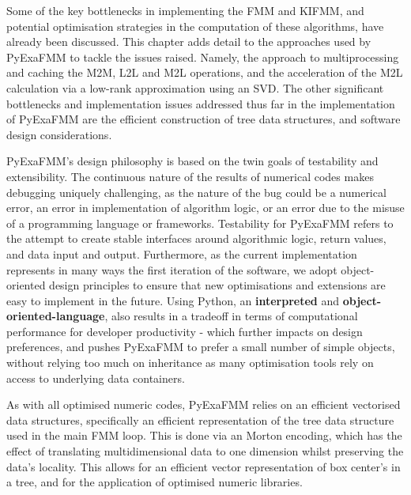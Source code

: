 Some of the key bottlenecks in implementing the \gls{FMM} and \gls{KIFMM}, and potential
optimisation strategies in the computation of these algorithms, have already been
discussed. This chapter adds detail to the approaches used by \gls{PyExaFMM} to tackle
the issues raised. Namely, the approach to multiprocessing and caching the \gls{M2M},
\gls{L2L} and \gls{M2L} operations, and the acceleration of the \gls{M2L} calculation
via a low-rank approximation using an \gls{SVD}. The other significant bottlenecks
and implementation issues addressed thus far in the implementation of \gls{PyExaFMM} are the
efficient construction of tree data structures, and software design considerations.

\gls{PyExaFMM}'s design philosophy is based on the twin goals of testability
and extensibility. The continuous nature of the results of numerical codes makes
debugging uniquely challenging, as the nature of the bug could be a numerical error,
an error in implementation of algorithm logic, or an error due to the misuse of a
programming language or frameworks. Testability for \gls{PyExaFMM} refers to
the attempt to create stable interfaces around algorithmic logic, return values,
and data input and output. Furthermore, as the current implementation represents
in many ways the first iteration of the software, we adopt object-oriented
design principles to ensure that new optimisations and extensions are easy
to implement in the future. Using Python, an \textbf{\gls{interpreted}} and
\textbf{\gls{object-oriented-language}}, also results in a tradeoff in terms of
computational performance for developer productivity - which further impacts
on design preferences, and pushes \gls{PyExaFMM} to prefer a small number of
simple objects, without relying too much on inheritance as many optimisation tools
rely on access to underlying data containers.

As with all optimised numeric codes, \gls{PyExaFMM} relies on an efficient
vectorised data structures, specifically an efficient representation of the tree
data structure used in the main \gls{FMM} loop. This is done via an Morton encoding,
which has the effect of translating multidimensional data to one dimension whilst
preserving the data's locality. This allows for an efficient vector representation
of box center's in a tree, and for the application of optimised numeric libraries.

